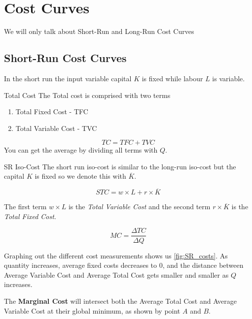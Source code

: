 \documentclass[../ECON-281-Notes.tex]{subfiles}
\begin{document}
\chapter{Cost Curves}
We will only talk about Short-Run and Long-Run Cost Curves
\section{Short-Run Cost Curves}
In the short run the input variable capital \(K\) is fixed while labour \(L\) is variable.

\begin{Definition}
    {Total Cost}
    The Total cost is comprised with two terms
    \begin{enumerate}
        \item Total Fixed Cost - TFC
        \item Total Variable Cost - TVC
    \end{enumerate}

    \begin{equation}
        TC = TFC + TVC  
    \end{equation}
    You can get the average by dividing all terms with \(Q\).
\end{Definition}

\begin{DndSidebar}[color=PhbLightGreen]{SR Iso-Cost}
  The short run iso-cost is similar to the long-run iso-cost but the capital $K$ is fixed so we denote this with $\overline{K}$.

  \begin{equation}
    STC = w \times L + r\times \overline{K}
  \end{equation}
  
  The first term $w\times L$ is the \emph{Total Variable Cost} and the second term $r\times \overline{K}$ is the \emph{Total Fixed Cost}.
\end{DndSidebar}


\begin{equation}
    MC = \frac{\Delta TC}{\Delta Q}
\end{equation}

Graphing out the different cost measurements shows us \cref{fig:SR_costs}.
As quantity increases, average fixed costs decreases to 0, and the distance between Average Variable Cost and Average Total Cost gets smaller and smaller as \(Q\) increases.

The \textbf{Marginal Cost} will intersect both the Average Total Cost and Average Variable Cost at their global minimum, as shown by point \(A\) and \(B\). 
\end{document}
